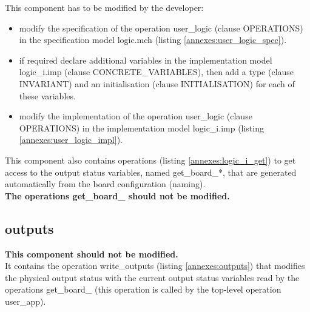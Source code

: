 This component has to be modified by the developer:
\begin{itemize}
    \item modify the specification of the operation user\_logic (clause OPERATIONS) in the specification model logic.mch (listing \ref{annexes:user_logic_spec}).
\end{itemize}

\begin{itemize}
    \item if required declare additional variables in the implementation model logic\_i.imp (clause CONCRETE\_VARIABLES), then add a type (clause INVARIANT) and an initialisation (clause INITIALISATION) for each of these variables.
    \item modify the implementation of the operation user\_logic (clause OPERATIONS) in the implementation model logic\_i.imp (listing \ref{annexes:user_logic_impl}).    
\end{itemize}

This component also contains operations (listing \ref{annexes:logic_i_get}) to get access to the output status variables, named get\_board\_*, that are generated automatically from the board configuration (naming). \\
\textbf{\color{ocre}The operations get\_board\_ should not be modified.}




\subsection{outputs}

\textbf{\color{ocre}This component should not be modified.} \\
It contains the operation write\_outputs (listing \ref{annexes:outputs}) that modifies the physical output status with the current output status variables read by the operations get\_board\_ (this operation is called by the top-level operation user\_app).


